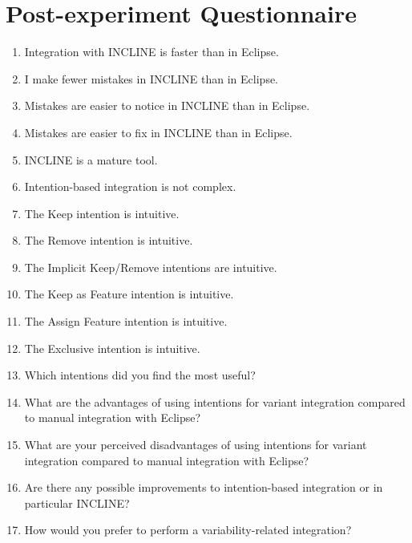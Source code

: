 \section{Post-experiment Questionnaire}
\begin{enumerate}
    \item Integration with INCLINE is faster than in Eclipse.
    \item I make fewer mistakes in INCLINE than in Eclipse.
    \item Mistakes are easier to notice in INCLINE than in Eclipse.
    \item Mistakes are easier to fix in INCLINE than in Eclipse.
    \item INCLINE is a mature tool.
    \item Intention-based integration is not complex.
    \item The Keep intention is intuitive.
    \item The Remove intention is intuitive.
    \item The Implicit Keep/Remove intentions are intuitive.
    \item The Keep as Feature intention is intuitive.
    \item The Assign Feature intention is intuitive.
    \item The Exclusive intention is intuitive.
    \item Which intentions did you find the most useful?
    \item What are the advantages of using intentions for variant integration compared to manual integration with Eclipse?
    \item What are your perceived disadvantages of using intentions for variant integration compared to manual integration with Eclipse?
    \item Are there any possible improvements to intention-based integration or in particular INCLINE?
    \item How would you prefer to perform a variability-related integration?
\end{enumerate}